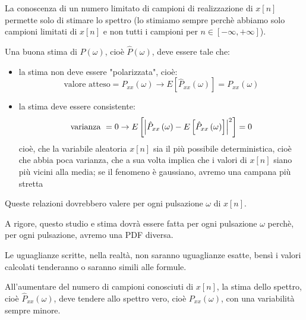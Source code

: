 La conoscenza di un numero limitato di campioni di realizzazione di $x \left[ n\right]$ permette solo di stimare lo spettro 
(lo stimiamo sempre perchè abbiamo solo campioni limitati di $x \left[ n\right]$ e non tutti i campioni per $n \in \left[ - \infty, + \infty\right]$). \newline 

Una buona stima di $P \left(\omega\right)$, cioè $\hat{P} \left(\omega\right)$, deve essere tale che: 

\begin{itemize}
    \item la stima non deve essere "polarizzata", cioè: 
    {
        \Large 
        \begin{equation}
            \text{valore atteso} 
            = 
            P_{xx} \left(\omega\right)
            \to 
            E \left[ \hat{P}_{xx} \left(\omega\right)\right] 
            = 
            P_{xx} \left(\omega\right)
        \end{equation}
    }
    \item la stima deve essere consistente: 
    {
        \Large 
        \begin{equation}
            \text{varianza }
            = 
            0 
            \to 
            E \left[ \abs{\hat{P}_{xx} \left(\omega\right) - E \left[ \hat{P}_{xx} \left(\omega\right)\right] }^{2}\right] 
            = 
            0
        \end{equation}
    } 
    cioè, che la variabile aleatoria $x \left[ n\right]$ sia il più possibile deterministica, cioè che abbia poca varianza, che a sua volta implica che i valori di $x \left[ n\right]$ siano più vicini alla media; se il fenomeno è gaussiano, avremo una campana più stretta 
\end{itemize}

Queste relazioni dovrebbero valere per ogni pulsazione $\omega$ di $x \left[ n\right]$. \newline 

\begin{tcolorbox}
A rigore, questo studio e stima dovrà essere fatta per ogni pulsazione $\omega$ perchè, per ogni pulsazione, avremo una PDF diversa.     
\end{tcolorbox}

Le uguaglianze scritte, nella realtà, non saranno uguaglianze esatte, bensì i valori calcolati tenderanno o saranno simili alle formule. \newline 

All'aumentare del numero di campioni conosciuti di $x \left[ n\right]$, la stima dello spettro, cioè $\hat{P}_{xx} \left(\omega\right)$, deve tendere allo spettro vero, cioè $P_{xx} \left(\omega\right)$, con una variabilità sempre minore. \newline 

